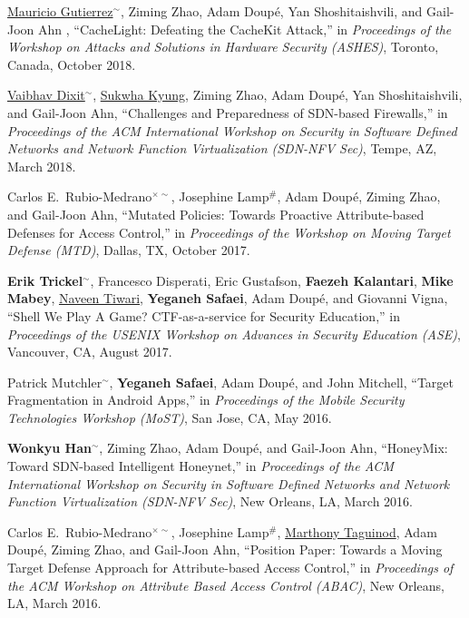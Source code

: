 \documentclass[11pt,letterpaper,sans]{moderncv}
\begin{document}
\begin{etaremune}

\item \underline{Mauricio Gutierrez}$^\sim$, Ziming Zhao, Adam Doup\'e, Yan Shoshitaishvili, and Gail-Joon Ahn , ``CacheLight: Defeating the CacheKit Attack,'' in \emph{Proceedings of the Workshop on Attacks and Solutions in Hardware Security (ASHES)}, Toronto, Canada, October 2018.

\item \underline{Vaibhav Dixit}$^\sim$, \underline{Sukwha Kyung}, Ziming
  Zhao, Adam Doupé, Yan Shoshitaishvili, and Gail-Joon Ahn,
  ``Challenges and Preparedness of SDN-based Firewalls,'' in
  \emph{Proceedings of the ACM International Workshop on Security in
    Software Defined Networks and Network Function Virtualization
    (SDN-NFV Sec)}, Tempe, AZ, March 2018. 

\item Carlos E.\ Rubio-Medrano$^{\times\sim}$, Josephine Lamp$^\#$, Adam
  Doup\'e, Ziming Zhao, and Gail-Joon Ahn, ``Mutated Policies: Towards
  Proactive Attribute-based Defenses for Access Control,'' in
  \emph{Proceedings of the Workshop on Moving Target Defense (MTD)},
  Dallas, TX, October 2017. 

\item \textbf{Erik Trickel}$^{\sim}$, Francesco Disperati, Eric Gustafson,
  \textbf{Faezeh Kalantari}, \textbf{Mike Mabey},
  \underline{Naveen Tiwari}, \textbf{Yeganeh Safaei}, Adam
    Doup\'e, and Giovanni Vigna, ``Shell We Play A Game?
  CTF-as-a-service for Security Education,'' in \emph{Proceedings of
    the USENIX Workshop on Advances in Security Education (ASE)},
  Vancouver, CA, August 2017.
      
\item Patrick Mutchler$^\sim$, \textbf{Yeganeh Safaei}, Adam
  Doup\'e, and John Mitchell, ``Target Fragmentation in Android
  Apps,'' in \emph{Proceedings of the Mobile Security Technologies
    Workshop (MoST)}, San Jose, CA, May 2016.

\item \textbf{Wonkyu Han}$^\sim$, Ziming Zhao, Adam Doup\'e, and
  Gail-Joon Ahn, ``HoneyMix: Toward SDN-based Intelligent Honeynet,''
  in \emph{Proceedings of the ACM International Workshop on Security
    in Software Defined Networks and Network Function Virtualization
    (SDN-NFV Sec)}, New Orleans, LA, March 2016.

\item Carlos E.\ Rubio-Medrano$^{\times\sim}$, Josephine
  Lamp$^\#$, \underline{Marthony Taguinod}, Adam Doup\'e,
  Ziming Zhao, and Gail-Joon Ahn, ``Position Paper: Towards a Moving
  Target Defense Approach for Attribute-based Access Control,'' in
  \emph{Proceedings of the ACM Workshop on Attribute Based Access
    Control (ABAC)}, New Orleans, LA, March 2016.


\end{etaremune}
\end{document}
